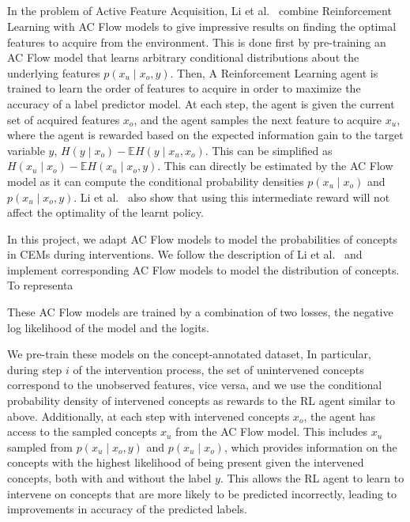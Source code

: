 \documentclass[../main.tex]{subfiles}
\begin{document}
\subsection{}

In the problem of Active Feature Acquisition, Li et al.~\cite{afa} combine Reinforcement Learning with 
AC Flow models to give impressive results on finding the optimal features to acquire from the environment. This is done
first by pre-training an AC Flow model that learns arbitrary conditional distributions about the underlying
features $p(x_u \mid x_o, y)$. Then, A Reinforcement Learning agent is trained to learn 
the order of features to acquire in order to maximize the accuracy of a label predictor model. At each
step, the agent is given the current set of acquired features $x_o$, and the agent samples the next 
feature to acquire $x_u$, where the agent is rewarded based on the expected information gain
to the target variable $y$, $H(y \mid x_o) - \mathbb{E} H(y \mid x_u, x_o)$. This can be simplified as
$H(x_u \mid x_o) - \mathbb{E}H(x_u \mid x_o, y)$. This can directly be estimated by the AC Flow model
as it can compute the conditional probability densities $p(x_u \mid x_o)$ and $p(x_u \mid x_o, y)$. Li et al.~\cite{afa} 
also show that using this intermediate reward will not affect the optimality of the learnt policy.

In this project, we adapt AC Flow models to model the probabilities of concepts in CEMs during interventions.
We follow the description of Li et al.~\cite{afa} and implement corresponding AC Flow models to model
the distribution of concepts. To representa


These AC Flow models are trained by a combination of two losses, the negative
log likelihood of the model and the logits.




We pre-train these models on the concept-annotated dataset,
In particular, during step $i$ of the intervention process, the set of unintervened concepts correspond 
to the unobserved features, vice versa, and we use the conditional probability density of 
intervened concepts as rewards to the RL agent similar to above. Additionally, at each step
with intervened concepts $x_o$, the agent has access to the sampled concepts $x_u$ from the AC Flow model.
This includes $x_u$ sampled from $p(x_u \mid x_o, y)$ and $p(x_u \mid x_o)$, which provides information
on the concepts with the highest likelihood of being present given the intervened concepts, both with and without
the label $y$.  This allows the RL agent to learn to intervene on concepts that are 
more likely to be predicted incorrectly, leading to improvements in accuracy of the predicted labels.
\end{document}
